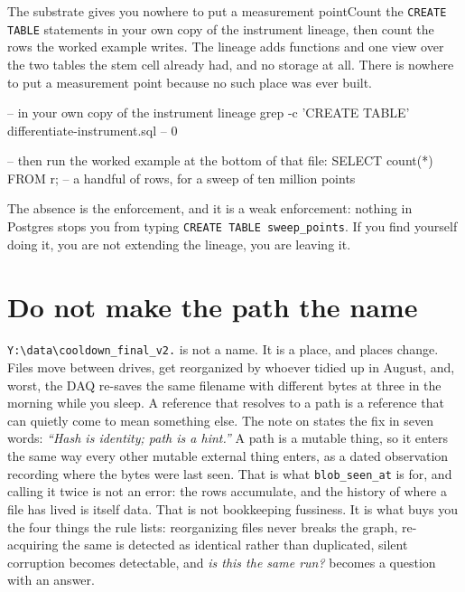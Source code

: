 \begin{Correspondence}{The substrate gives you nowhere to put a measurement point}{Count the \texttt{CREATE TABLE} statements in your own copy of the instrument lineage, then count the rows the worked example writes.}
The lineage adds functions and one view over the two tables the stem cell already had, and no storage at all. There is nowhere to put a measurement point because no such place was ever built.
\begin{Check}
-- in your own copy of the instrument lineage
grep -c 'CREATE TABLE' differentiate-instrument.sql   -- 0

-- then run the worked example at the bottom of that file:
SELECT count(*) FROM r;   -- a handful of rows, for a sweep of ten million points
\end{Check}
The absence is the enforcement, and it is a weak enforcement: nothing in Postgres stops you from typing \texttt{CREATE TABLE sweep\_points}. If you find yourself doing it, you are not extending the lineage, you are leaving it.
\end{Correspondence}

\section{Do not make the path the name}

\texttt{Y:\textbackslash data\textbackslash cooldown\_final\_v2.\labFileExt} is not a name. It is a place, and places change. Files move between drives, get reorganized by whoever tidied up in August, and, worst, the DAQ re-saves the same filename with different bytes at three in the morning while you sleep. A reference that resolves to a path is a reference that can quietly come to mean something else. The note on  states the fix in seven words: \textit{``Hash is identity; path is a hint.''} A path is a mutable thing, so it enters the same way every other mutable external thing enters, as a dated observation recording where the bytes were last seen. That is what \texttt{blob\_seen\_at} is for, and calling it twice is not an error: the rows accumulate, and the history of where a file has lived is itself data. That is not bookkeeping fussiness. It is what buys you the four things the rule lists: reorganizing files never breaks the graph, re-acquiring the same \labScan{} is detected as identical rather than duplicated, silent corruption becomes detectable, and \textit{is this the same run?} becomes a question with an answer.

